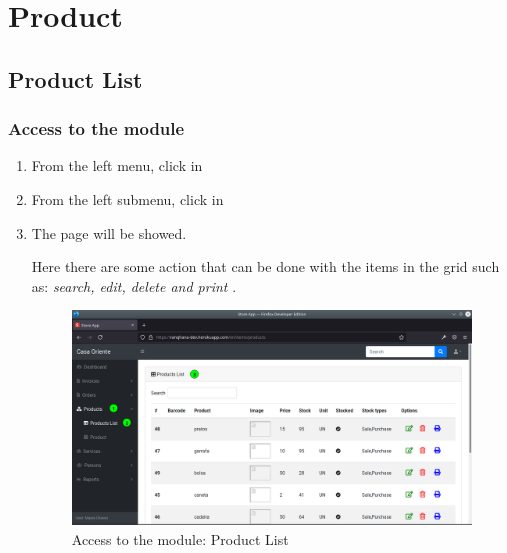 \documentclass[a4paper,11pt]{refart}
\begin{document}
\section{Product}

\subsection{Product List}

\subsubsection{Access to the module}
\begin{enumerate}
	\item From the left menu, click in  
	\item From the left submenu, click in  
	\item The page will be showed.
	\medskip
	\begin{leftbar}
		Here there are some action that can be done with the items in the grid such as:  \emph{search, edit, delete and print} .
	\end{leftbar}
	\begin{figure}[H]\centering
		\includegraphics[width=\textwidth]{images/produc_list-access.png}
		\caption{Access to the module: Product List}
		\label{fig:produc_list-access.png}
	\end{figure}
\end{enumerate}
\end{document}

